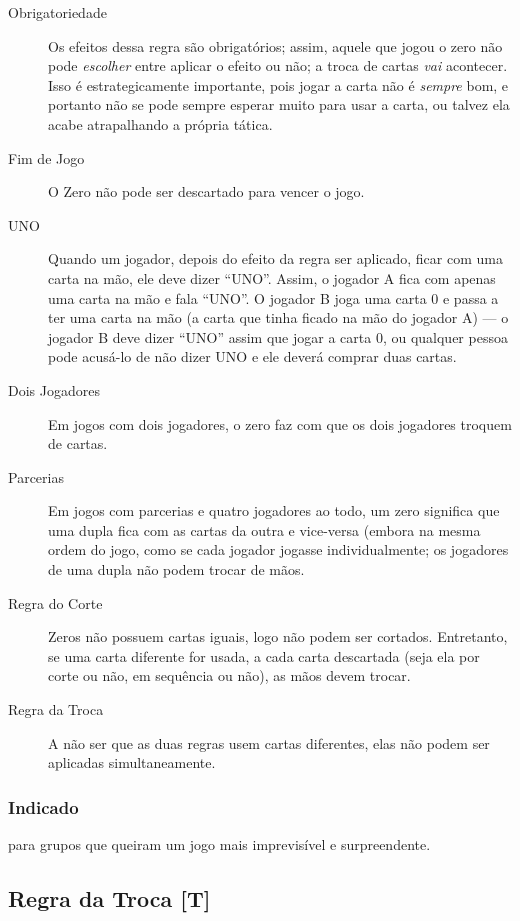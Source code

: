 \begin{description}
\item[Obrigatoriedade]{Os efeitos dessa regra são obrigatórios; assim, aquele que jogou o zero não pode \emph{escolher} entre aplicar o efeito ou não; a troca de cartas \emph{vai} acontecer. Isso é estrategicamente importante, pois jogar a carta não é \textit{sempre} bom, e portanto não se pode sempre esperar muito para usar a carta, ou talvez ela acabe atrapalhando a própria tática.}
\item[Fim de Jogo]{O Zero não pode ser descartado para vencer o jogo.}
\item[UNO]{Quando um jogador, depois do efeito da regra ser aplicado, ficar com uma carta na mão, ele deve dizer ``UNO''. Assim, o jogador A fica com apenas uma carta na mão e fala ``UNO''. O jogador B joga uma carta 0 e passa a ter uma carta na mão (a carta que tinha ficado na mão do jogador A) --- o jogador B deve dizer ``UNO'' assim que jogar a carta 0, ou qualquer pessoa pode acusá-lo de não dizer UNO e ele deverá comprar duas cartas.}
\item[Dois Jogadores]{Em jogos com dois jogadores, o zero faz com que os dois jogadores troquem de cartas.}
\item[Parcerias]{Em jogos com parcerias e quatro jogadores ao todo, um zero significa que uma dupla fica com as cartas da outra e vice-versa (embora na mesma ordem do jogo, como se cada jogador jogasse individualmente; os jogadores de uma dupla não podem trocar de mãos.}
\item[Regra do Corte]{Zeros não possuem cartas iguais, logo não podem ser cortados. Entretanto, se uma carta diferente for usada, a cada carta descartada (seja ela por corte ou não, em sequência ou não), as mãos devem trocar.}
\item[Regra da Troca]{A não ser que as duas regras usem cartas diferentes, elas não podem ser aplicadas simultaneamente.}
\end{description}

\subsubsection{Indicado}

para grupos que queiram um jogo mais imprevisível e surpreendente.

\subsection{Regra da Troca [T]}

